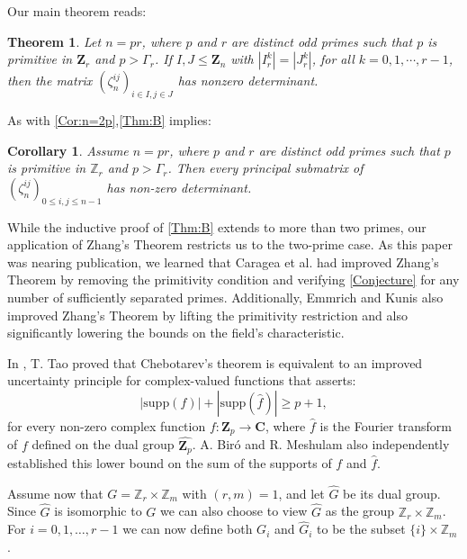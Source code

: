 \documentclass[10pt,a4paper]{amsart}
\newtheorem{prevtheorem}{Theorem}
\newtheorem{corollary}{Corollary}
\def\Z{\mathbf{Z}}
\def\C{\mathbf{C}}
\def\supp{\mathrm{supp}}
\begin{document}
Our main theorem reads:

\begin{prevtheorem}
\label{Thm:B}
Let $ n = pr$, where $ p $ and $r$ are distinct odd primes such that $p$ is primitive in $\Z_r$ and $ p >\Gamma_r$.    If $I, J \leq \Z_{n}$ with $|I_r^k| = |J_r^k|$, for all $k=0,1, \cdots,  r-1$, then the matrix $(\zeta_{n}^{ij})_{i \in I, j\in J}$ has nonzero determinant.    
\end{prevtheorem}




As with \autoref{Cor:n=2p},\autoref{Thm:B} implies:
\begin{corollary}\label{Cor:n=pr}
    Assume  $ n = pr$, where $ p $ and $r$ are distinct odd primes such that $p$ is primitive in  $\mathbb{Z}_r$ and $ p >\Gamma_r$. Then every principal  submatrix of $(\zeta_n^{ij})_{0 \leq i,j\leq n-1}$ has non-zero determinant.
\end{corollary}

While the inductive proof of \autoref{Thm:B} extends to more than two primes, our application of Zhang's Theorem restricts us to the two-prime case. %
As this paper was nearing publication, we learned that Caragea et al. \cite{CaLeMaPf} had improved Zhang's Theorem by removing the primitivity condition and  verifying \autoref{Conjecture} for any number of sufficiently separated primes. Additionally, Emmrich and Kunis \cite{EmKu} also improved Zhang's Theorem by lifting the primitivity restriction and also significantly lowering the bounds on the field's characteristic.


In \cite{Tao}, T. Tao proved that Chebotarev's theorem is equivalent to an improved uncertainty principle for complex-valued functions that  asserts: 
\[
|\supp(f)| + |\supp(\widehat{f})| \geq p + 1, 
\]
for every non-zero complex function $f : \Z_p \to \C$, where $\widehat{f}$ is the Fourier transform of $f$ defined on the dual group $\widehat{\Z_p}$. A. Biró \cite{Biro} and R. Meshulam \cite{Meshulam} also independently established this lower bound on the sum of the supports of $f$ and $\widehat{f}$.


Assume now that $G = \mathbb{Z}_r \times \mathbb{Z}_m$ with $(r, m) = 1$, and let $\widehat{G}$ be its dual group. Since $\widehat{G}$ is isomorphic to $G$ we can also choose to view $\widehat{G}$ as the group $\mathbb{Z}_r\times\mathbb{Z}_m$. For $i=0, 1, \ldots, r-1$ we can now define both $G_i$ and $\widehat{G}_i$ to be the subset $\{i\}\times\mathbb{Z}_m$.
\end{document}
